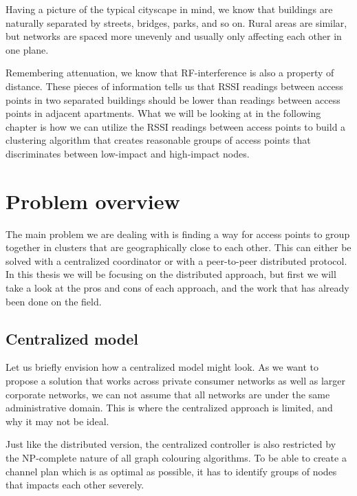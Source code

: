 Having a picture of the typical cityscape in mind, we know that buildings are naturally
separated by streets, bridges, parks, and so on. Rural areas are similar, but networks are spaced more unevenly
and usually only affecting each other in one plane.

Remembering attenuation, we know that RF-interference is also a property of distance. 
These pieces of information tells us that RSSI readings between access points in two separated buildings should be lower than readings between access points in adjacent apartments.
What we will be looking at in the following chapter is how we can utilize the RSSI readings between access points to build a clustering algorithm that creates reasonable groups
of access points that discriminates between low-impact and high-impact nodes.  


\section{Problem overview}
The main problem we are dealing with is finding a way for access points to group together in clusters that are geographically close to each other. This can either be solved with a centralized
coordinator or with a peer-to-peer distributed protocol. In this thesis we will be focusing on the distributed approach, but first we will take a look at the pros and cons of each approach, and
the work that has already been done on the field.

\subsection{Centralized model}
Let us briefly envision how a centralized model might look. As we want to propose a solution that works across private consumer networks as well as larger corporate networks,
we can not assume that all networks are under the same administrative domain. This is where the centralized approach is limited, and why it may not be ideal.

Just like the distributed version, the centralized controller is also restricted by the NP-complete nature of all graph colouring algorithms.
To be able to create a channel plan which is as optimal as possible, it has to identify groups of nodes that impacts each other severely. 

